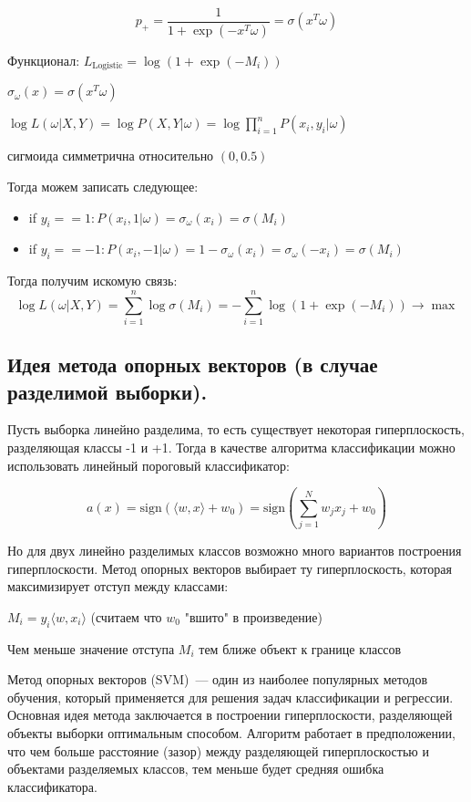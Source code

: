 $$p_+ = \frac{1}{1 + \exp(-x^T\omega)} = \sigma(x^T\omega)$$

Функционал: $L_{\text{Logistic}} = \log(1 + \exp(-M_i))$

\Note $\sigma_{\omega}(x) = \sigma(x^T\omega)$

\Note $\log L(\omega | X, Y) = \log P (X, Y | \omega) = \log \prod \limits_{i=1}^{n} P(x_i, y_i | \omega)$

\Note сигмоида симметрична относительно $(0, 0.5)$

Тогда можем записать следующее:

\begin{itemize}
    \item if $y_i == 1 : P(x_i, 1 | \omega) = \sigma_{\omega} (x_i) = \sigma(M_i)$
    \item if $y_i == -1 : P(x_i, -1 | \omega) = 1 - \sigma_{\omega} (x_i) = \sigma_{\omega} (-x_i) = \sigma(M_i)$
\end{itemize}

Тогда получим искомую связь: $$\log L(\omega | X, Y) = \sum \limits_{i=1}^n \log \sigma(M_i) = 
- \sum \limits_{i=1}^n \log (1 + \exp(-M_i)) \to \max$$









\subsection{Идея метода опорных векторов (в случае разделимой выборки).}

Пусть выборка линейно разделима, то есть существует некоторая гиперплоскость, разделяющая классы -1 и +1. Тогда в качестве алгоритма классификации можно использовать линейный пороговый классификатор:

$$a(x) = \text{sign}(\langle w, x\rangle + w_0) = \text{sign}\left(\sum\limits_{j=1}^Nw_jx_j + w_0\right)$$

Но для двух линейно разделимых классов возможно много вариантов построения гиперплоскости. Метод опорных векторов выбирает ту гиперплоскость, которая максимизирует отступ между классами:

\Remind $M_i = y_i\langle w, x_i\rangle$ (считаем что $w_0$ "вшито" в произведение)

\Note Чем меньше значение отступа $M_i$ тем ближе объект к границе классов

\Def Метод опорных векторов (SVM)~--- один из наиболее популярных методов обучения, который применяется для решения задач классификации и регрессии. Основная идея метода заключается в построении гиперплоскости, разделяющей объекты выборки оптимальным способом. Алгоритм работает в предположении, что чем больше расстояние (зазор) между разделяющей гиперплоскостью и объектами разделяемых классов, тем меньше будет средняя ошибка классификатора.














